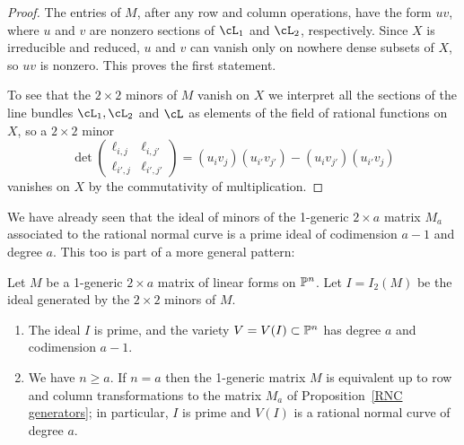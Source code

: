 \begin{proof}
The entries of $M$, after any row and column operations, have the form $uv$, where
$u$ and $v$ are nonzero sections of $\cL_1$ and $\cL_2$, respectively. Since $X$ is irreducible and reduced, $u$ and $v$ can vanish only on nowhere dense subsets of $X$, so $uv$ is nonzero. This proves the first statement.

To see that the $2\times 2$ minors of $M$ vanish on $X$ we interpret all the sections of the line bundles $\cL_{1}, \cL_{2}$ and $\cL$ as elements of the 
field of rational functions on $X$, so a $2\times 2$ minor 
$$
\det
\begin{pmatrix}
 \ell_{i,j}&\ell_{i,j'} \\
 \ell_{i',j}&\ell_{i',j'}
\end{pmatrix}
= (u_iv_j)(u_{i'}v_{j'}) - (u_{i}v_{j'}) (u_{i'}v_{j})
$$
vanishes on $X$ by the commutativity of multiplication.
\end{proof}

We have already seen that the ideal of minors of the 1-generic $2\times a$ matrix $M_{a}$ associated to the rational normal curve is a prime ideal of codimension $a-1$ and degree $a$. This too is part of a more general pattern:

\begin{theorem}\label{1-generic basics} Let $M$ be a 1-generic $2\times a$ matrix of linear forms on $\PP^n$. 
Let $I = I_2(M)$  be the ideal generated by the $2\times 2$ minors of $M$. \begin{enumerate}

\item The ideal $I$ is
prime, and the variety $V = V(I) \subset \PP^n$ has degree $a$ and codimension $a-1$.

\item We have $n\geq a$. If $n = a$ then the 1-generic matrix
$M$ is equivalent up to row and column transformations to the matrix $M_{a}$ of Proposition~\ref{RNC generators};
in particular, $I$ is prime and $V(I)$ is a rational normal
curve of degree $a$.
\end{enumerate}

\end{theorem}

